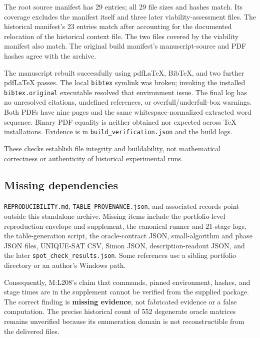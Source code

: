 \documentclass[
  11pt,
]{article}
\begin{document}
The root source manifest has 29 entries; all 29 file sizes and hashes
match. Its coverage excludes the manifest itself and three later
viability-assessment files. The historical manifest's 23 entries match
after accounting for the documented relocation of the historical context
file. The two files covered by the viability manifest also match. The
original build manifest's manuscript-source and PDF hashes agree with
the archive.

The manuscript rebuilt successfully using pdfLaTeX, BibTeX, and two
further pdfLaTeX passes. The local \nolinkurl{bibtex} symlink was
broken; invoking the installed \nolinkurl{bibtex.original} executable
resolved that environment issue. The final log has no unresolved
citations, undefined references, or overfull/underfull-box warnings.
Both PDFs have nine pages and the same whitespace-normalized extracted
word sequence. Binary PDF equality is neither obtained nor expected
across TeX installations. Evidence is in
\nolinkurl{build_verification.json} and the build logs.

These checks establish file integrity and buildability, not mathematical
correctness or authenticity of historical experimental runs.

\subsection{Missing dependencies}\label{missing-dependencies}

\nolinkurl{REPRODUCIBILITY.md}, \nolinkurl{TABLE_PROVENANCE.json}, and
associated records point outside this standalone archive. Missing items
include the portfolio-level reproduction envelope and supplement, the
canonical runner and 21-stage logs, the table-generation script, the
oracle-contract JSON, small-algorithm and phase JSON files, UNIQUE-SAT
CSV, Simon JSON, description-readout JSON, and the later
\nolinkurl{spot_check_results.json}. Some references use a sibling
portfolio directory or an author's Windows path.

Consequently, M:L208's claim that commands, pinned environment, hashes,
and stage times are in the supplement cannot be verified from the
supplied package. The correct finding is \textbf{missing evidence}, not
fabricated evidence or a false computation. The precise historical count
of 552 degenerate oracle matrices remains unverified because its
enumeration domain is not reconstructible from the delivered files.

\newpage
\end{document}
